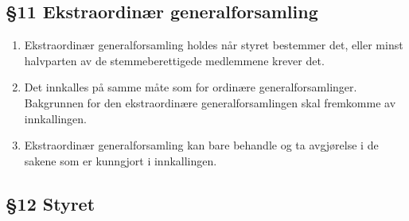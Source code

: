 \documentclass[a4paper,11pt,titlepage]{article}
\begin{document}
\subsection*{§11 Ekstraordinær generalforsamling}

\begin{enumerate}

\item Ekstraordinær generalforsamling holdes når styret bestemmer det, eller minst halvparten av de stemmeberettigede medlemmene krever det.

\item Det innkalles på samme måte som for ordinære generalforsamlinger. Bakgrunnen for den ekstraordinære generalforsamlingen skal fremkomme av innkallingen.

\item Ekstraordinær generalforsamling kan bare behandle og ta avgjørelse i de sakene som er kunngjort i innkallingen.

\end{enumerate}

\subsection*{§12 Styret}
\end{document}
